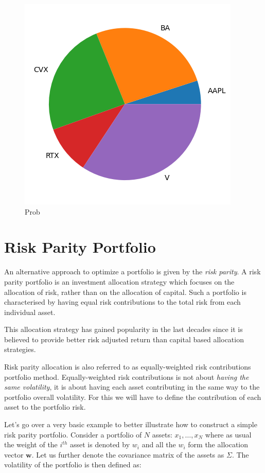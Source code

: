\begin{figure}[h]
  \begin{center}
    \includegraphics[width=0.6\linewidth]{figures/black_litterman_weights}
  \end{center}
  \caption{Prob}
  \label{fig:black_litterman_weights}
\end{figure}



\section{Risk Parity Portfolio}
\label{risk-parity-portfolio}

An alternative approach to optimize a portfolio is given by the \emph{risk parity}. A risk parity portfolio is an investment allocation strategy which focuses on the allocation of risk, rather than on the allocation of capital. 
Such a portfolio is characterised by having equal risk contributions to the total risk from each individual asset. 

This allocation strategy has gained popularity in the last decades since it is believed to provide better risk adjusted return than capital based allocation strategies.

Risk parity allocation is also referred to as equally-weighted risk contributions portfolio method. Equally-weighted risk contributions is not about \emph{having the same volatility}, it is about having each asset contributing in the same way to the portfolio overall volatility. For this we will have to define the contribution of each asset to the portfolio risk. 

Let's go over a very basic example to better illustrate how to construct a simple risk parity portfolio. Consider a portfolio of \(N\) assets: \(x_{1}, \ldots, x_N\) where as usual the weight of the $i^{th}$ asset is denoted by \(w_{i}\) and all the \(w_{i}\) form the allocation vector \(\mathbf{w}\). Let us further denote the covariance matrix of the assets as \(\Sigma\). The volatility of the portfolio is then defined as:


